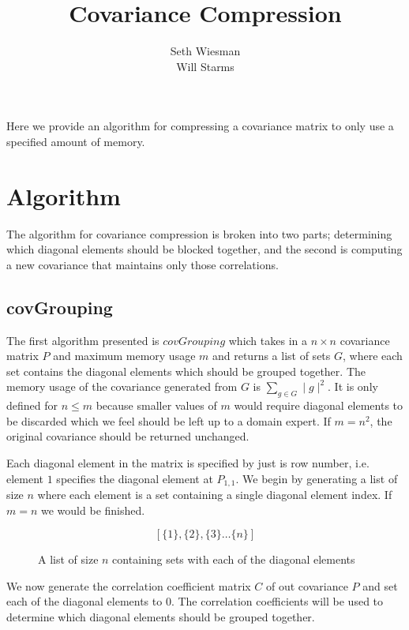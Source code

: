 \documentclass[11pt]{article}
\title{Covariance Compression}
\author{Seth Wiesman\\Will Starms}
\begin{document}
\maketitle

Here we provide an algorithm for compressing a covariance matrix to only use a specified amount of memory. 

\section{Algorithm}
The algorithm for covariance compression is broken into two parts; determining which diagonal elements should be blocked together, and the second is computing a new covariance that maintains only those correlations. 

\subsection{covGrouping}
The first algorithm presented is $covGrouping$ which takes in a $n \times n$ covariance matrix $P$ and maximum memory usage $m$ and returns a list of sets $G$, where each set contains the diagonal elements which should be grouped together. 
The memory usage of the covariance generated from $G$ is $\sum_{g \in G}\mid g \mid^2$.
It is only defined for $n \leq m$ because smaller values of $m$ would require diagonal elements to be discarded which we feel should be left up to a domain expert. 
If $m = n^2$, the original covariance should be returned unchanged. 

Each diagonal element in the matrix is specified by just is row number, i.e. element $1$ specifies the diagonal element at $P_{1,1}$.
We begin by generating a list of size $n$ where each element is a set containing a single diagonal element index. 
If $m = n$ we would be finished. 
\begin{figure}
	$$
		\left[\{1\},\{2\},\{3\}\dots \{n\}\right]
	$$
	\caption{A list of size $n$ containing sets with each of the diagonal elements}
\end{figure}

We now generate the correlation coefficient matrix $C$ of out covariance $P$ and set each of the diagonal elements to $0$.
The correlation coefficients will be used to determine which diagonal elements should be grouped together. 
\end{document}
